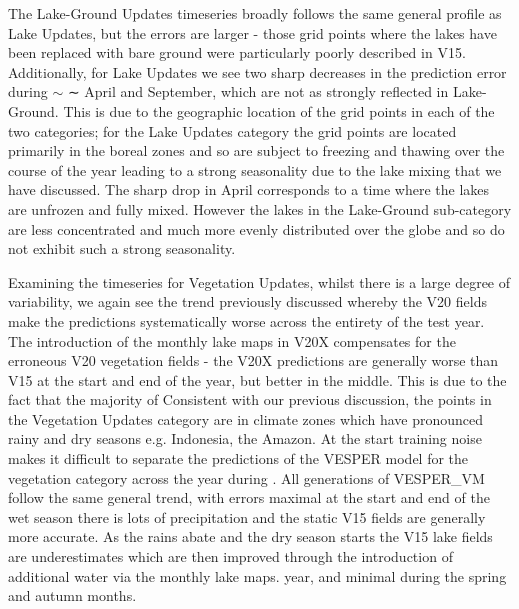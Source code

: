 \documentclass[hess, twostagejnl]{copernicus}
\providecommand{\DIFadd}[1]{{\protect\color{blue} \sf #1}} %
\providecommand{\DIFdel}[1]{{\protect\color{red} \scriptsize #1}} %
\providecommand{\DIFaddbegin}{} %
\providecommand{\DIFaddend}{} %
\providecommand{\DIFdelbegin}{} %
\providecommand{\DIFdelend}{} %
\begin{document}
\DIFaddend The Lake-Ground Updates timeseries broadly follows the same general profile as Lake Updates, but the errors are larger - those grid points where the lakes have been replaced with bare ground were particularly poorly described in V15. Additionally, for Lake Updates we see two sharp decreases in the prediction error during \DIFdelbegin \DIFdel{$\sim$ }\DIFdelend \DIFaddbegin \DIFadd{∼ }\DIFaddend April and September, which are not as strongly reflected in Lake-Ground. This is due to the geographic location of the grid points in each of the two categories; for the Lake Updates category the grid points are located primarily in the boreal zones and so are subject to freezing and thawing over the course of the year leading to a strong seasonality due to the lake mixing that we have discussed. The sharp drop in April corresponds to a time where the lakes are unfrozen and fully mixed. However the lakes in the Lake-Ground sub-category are less concentrated and much more evenly distributed over the globe and so do not exhibit such a strong seasonality. \DIFdelbegin %

\DIFdel{Examining the timeseries for Vegetation Updates, whilst there is a large degree of variability, we again see the trend previously discussed whereby the V20 fields make the predictions systematically worse across the entirety of the test year. The introduction of the monthly lake maps in V20X compensates for the erroneous V20 vegetation fields - the V20X predictions are generally worse than V15 at the start and end of the year, but better in the middle. This is due to the fact that the majority of }\DIFdelend \DIFaddbegin \DIFadd{Consistent with our previous discussion, }\DIFaddend the \DIFdelbegin \DIFdel{points in the Vegetation Updates category are in climate zones which have pronounced rainy and dry seasons e.g. Indonesia, the Amazon. At the start }\DIFdelend \DIFaddbegin \DIFadd{training noise makes it difficult to separate the predictions }\DIFaddend of the \DIFaddbegin \DIFadd{VESPER model for the vegetation category across the }\DIFaddend year\DIFdelbegin \DIFdel{during }\DIFdelend \DIFaddbegin \DIFadd{. All generations of VESPER\_VM follow the same general trend, with errors maximal at the start and end of }\DIFaddend the \DIFdelbegin \DIFdel{wet season there is lots of precipitation and the static V15 fields are generally more accurate. As the rains abate and the dry season starts the V15 lake fields are underestimates which are then improved through the introduction of additional water via the monthly lake maps. }\DIFdelend \DIFaddbegin \DIFadd{year, and minimal during the spring and autumn months. }\DIFaddend \newline 
\end{document}
